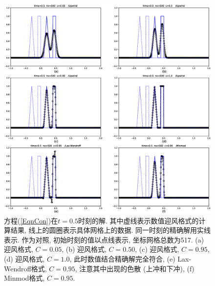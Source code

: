 \documentclass[10.5pt
]{article}
\begin{document}
\begin{figure}[htb]
\centering
\includegraphics[width=\textwidth]{hw2_1_c.eps}
\caption{方程(\ref{EqnCon})在$t=0.5$时刻的解. 其中虚线表示数值迎风格式的计算结果, 线上的圆圈表示具体网格上的数据. 同一时刻的精确解用实线表示. 作为对照, 初始时刻的值以点线表示, 坐标网格总数为517. (a) 迎风格式, $C = 0.05$, (b)  迎风格式, $C = 0.50$, (c)  迎风格式, $C = 0.95$, (d) 迎风格式, $C = 1.0$, 此时数值结合精确解完全符合, (e) Lax-Wendroff格式, $C=0.95$, 注意其中出现的色散 (上冲和下冲), (f) Minmod格式, $C=0.95$.} \label{fig11}
\end{figure}
\end{document}
